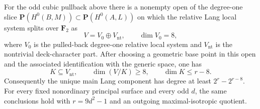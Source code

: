 \begin{proposition}
\label{prop:DE-Lang-deck-slice-quotient-eight}
For the odd cubic pullback above there is a nonempty open of the
degree-one slice \(\mathbf P(H^0(B,M))\subset\mathbf P(H^0(A,L))\)
on which the relative Lang local system splits over \(\mathbf F_2\)
as
\[
                 V=V_0\oplus V_{\mathrm{nt}},\qquad
                 \dim V_0=8,
 \tag{DE-DS1}
\]
where \(V_0\) is the pulled-back degree-one relative local system
and \(V_{\mathrm{nt}}\) is the nontrivial deck-character part.
After choosing a geometric base point in this open and the associated
identification with the generic space, one has
\[
 K\subseteq V_{\mathrm{nt}},\qquad
 \dim(V/K)\geq8,\qquad \dim K\leq r-8.
 \tag{DE-DS2}
\]
Consequently the unique main Lang component has degree at least
\(2^r-2^{r-8}\). For every fixed nonordinary principal surface
and every odd \(d\), the same conclusions hold with
\(r=9d^2-1\) and an outgoing maximal-isotropic quotient.
\end{proposition}
